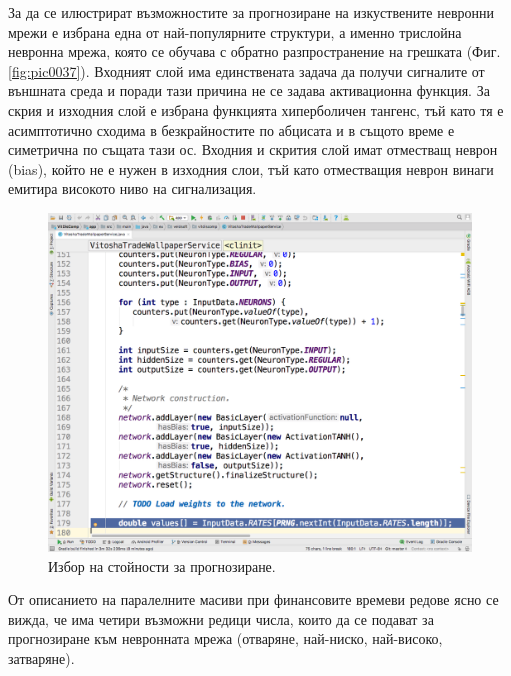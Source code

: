 \documentclass[book,14pt,oneside,openany]{memoir}
\begin{document}
За да се илюстрират възможностите за прогнозиране на изкуствените невронни мрежи е избрана една от най-популярните структури, а именно трислойна невронна мрежа, която се обучава с обратно разпространение на грешката (Фиг. \ref{fig:pic0037}). Входният слой има единствената задача да получи сигналите от външната среда и поради тази причина не се задава активационна функция. За скрия и изходния слой е избрана функцията хиперболичен тангенс, тъй като тя е асимптотично сходима в безкрайностите по абцисата и в същото време е симетрична по същата тази ос. Входния и скрития слой имат отместващ неврон (bias), който не е нужен в изходния слои, тъй като отместващия неврон винаги емитира високото ниво на сигнализация.

\begin{figure}[h]
  \centering
  \includegraphics[height=0.45\pdfpageheight]{pic0038}
  \caption{Избор на стойности за прогнозиране.}
\label{fig:pic0038}
\end{figure}
\FloatBarrier

От описанието на паралелните масиви при финансовите времеви редове ясно се вижда, че има четири възможни редици числа, които да се подават за прогнозиране към невронната мрежа (отваряне, най-ниско, най-високо, затваряне). 
\end{document}

